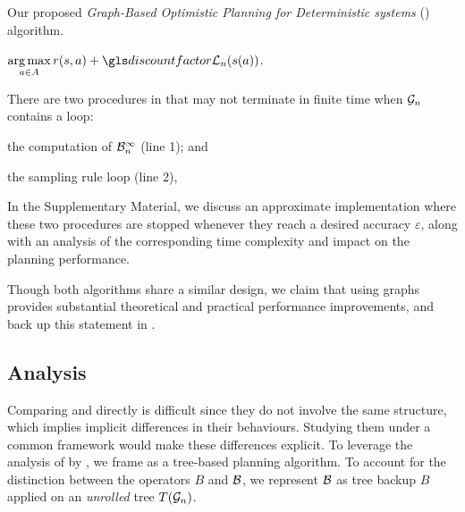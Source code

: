 \begin{algorithm}[th]
	\caption{Our proposed \emph{Graph-Based Optimistic Planning for Deterministic systems} (\GBOPD) algorithm.}
	\label{alg:gbop-d}
	\DontPrintSemicolon
	\Return $\displaystyle\argmax_{a\in A} r(s,a) + \discount \cL_n(s(a))$. 
\end{algorithm}

\begin{remark}
	\begin{leftbar}[remarkbar]
	There are two procedures in \GBOPD that may not terminate in finite time when $\mathcal{G}_n$ contains a loop:
	\begin{enumerate*}[label=(\roman*)]
		\item the computation of $\mathcal{B}_n^\infty$ (line 1); and
		\item the sampling rule loop (line 2),
	\end{enumerate*}
	In the Supplementary Material, we discuss an approximate implementation where these two procedures are stopped whenever they reach a desired accuracy $\varepsilon$, along with an analysis of the corresponding time complexity and impact on the planning performance.
	\end{leftbar}
\end{remark}

Though both algorithms share a similar design, we claim that using graphs provides substantial theoretical and practical performance improvements, and back up this statement in .

\subsection{Analysis}
\label{sec:analysis}

Comparing \OPD and \GBOPD directly is difficult since they do not involve the same structure, which implies implicit differences in their behaviours. Studying them under a common framework would make these differences explicit. To leverage the analysis of \OPD by \citet{Hren2008optimistic}, we frame \GBOPD as a tree-based planning algorithm. To account for the distinction between the operators $B$ and $\mathcal{B}$, we represent $\mathcal{B}$ as tree backup $B$ applied on an \emph{unrolled} tree $T(\mathcal{G}_n)$.

